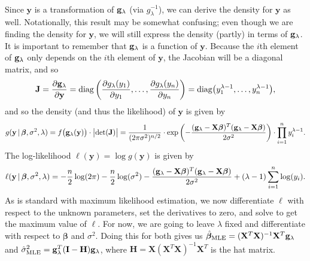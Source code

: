 \documentclass[10pt]{article}
\begin{document}
\begin{itemize}
\begin{align*}
    \end{align*}
    Since \(\mathbf{y}\) is a transformation of \(\mathbf{g}_{\lambda}\) (via \(g_{\lambda}^{-1}\)), we can derive the density for \(\mathbf{y}\) as well. Notationally, this result may be somewhat 
    confusing; even though we are finding the density for \(\mathbf{y}\), we will still express the density (partly) in terms of \(\mathbf{g}_{\lambda}\). It is important
    to remember that \(\mathbf{g}_{\lambda}\) is a function of \(\mathbf{y}\). Because the \(i\)th element of \(\mathbf{g}_{\lambda}\) only depends on the \(i\)th element of \(\mathbf{y}\), the Jacobian
    will be a diagonal matrix, and so 
    \begin{align*}
        \mathbf{J}
        = \frac{\partial \mathbf{g}_{\lambda}}{\partial \mathbf{y}}
        = \mathrm{diag} \left( \frac{\partial g_{\lambda}(y_1)}{\partial y_1}, \ldots, \frac{\partial g_{\lambda}(y_n)}{\partial y_n} \right)
        = \mathrm{diag} \big( y_1^{\lambda - 1}, \ldots, y_n^{\lambda - 1} \big), 
    \end{align*}
    and so the density (and thus the likelihood) of \(\mathbf{y}\) is given by 
    \begin{align*}
        g(\mathbf{y} \,|\, \bm{\beta}, \sigma^2, \lambda)
        = f \big( \mathbf{g}_{\lambda}(\mathbf{y}) \big) \cdot \big|\mathrm{det}(\mathbf{J})\big|
        = \frac{1}{(2\pi\sigma^2)^{n/2}} \cdot \mathrm{exp} \left( - \frac{(\mathbf{g}_{\lambda} - \mathbf{X}\bm{\beta})^T (\mathbf{g}_{\lambda} - \mathbf{X}\bm{\beta})}{2 \sigma^2} \right) \cdot \prod_{i=1}^n y_i^{\lambda - 1}.
    \end{align*}
    The log-likelihood \(\ell(\mathbf{y}) = \log g(\mathbf{y})\) is given by 
    \begin{align*}
        \ell(\mathbf{y} \,|\, \bm{\beta}, \sigma^2, \lambda) 
        = - \frac{n}{2} \log (2\pi) - \frac{n}{2} \log (\sigma^2) - \frac{(\mathbf{g}_{\lambda} - \mathbf{X}\bm{\beta})^T (\mathbf{g}_{\lambda} - \mathbf{X}\bm{\beta})}{2 \sigma^2} + (\lambda - 1) \sum_{i=1}^n \log (y_i).
    \end{align*}
    As is standard with maximum likelihood estimation, we now differentiate \(\ell\) with respect to the unknown parameters, set the derivatives to zero, and solve to get the maximum value of \(\ell\). 
    For now, we are going to leave \(\lambda\) fixed and differentiate with respect to \(\bm{\beta}\) and \(\sigma^2\). Doing this for both gives us 
    \(\hat{\bm{\beta}}_{\mathrm{MLE}} = (\mathbf{X}^T\mathbf{X})^{-1}\mathbf{X}^T\mathbf{g}_{\lambda}\) and \(\hat{\sigma}^2_{\mathrm{MLE}} = \mathbf{g}_{\lambda}^T (\mathbf{I} - \mathbf{H}) \mathbf{g}_{\lambda}\), where 
    \(\mathbf{H} = \mathbf{X}(\mathbf{X}^T\mathbf{X})^{-1}\mathbf{X}^T\) is the hat matrix. 

\end{itemize}
\end{document}
